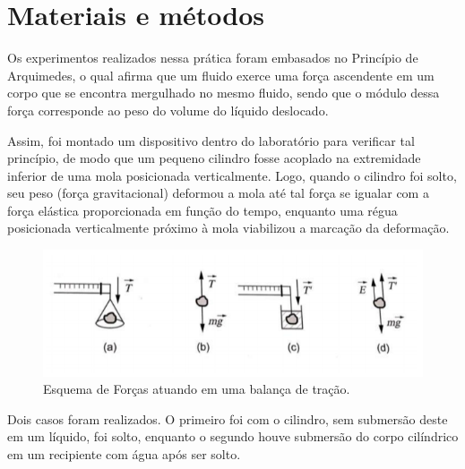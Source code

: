 \newpage
\section{Materiais e métodos}

Os experimentos realizados nessa prática foram embasados no Princípio de Arquimedes, o qual afirma que um fluido exerce uma força ascendente em um corpo que se encontra mergulhado no mesmo fluido, sendo que o módulo dessa força corresponde ao peso do volume do líquido deslocado.

Assim, foi montado um dispositivo dentro do laboratório para verificar tal princípio, de modo que um pequeno cilindro fosse acoplado na extremidade inferior de uma mola posicionada verticalmente. Logo, quando o cilindro foi solto, seu peso (força gravitacional) deformou a mola até tal força se igualar com a força elástica proporcionada em função do tempo, enquanto uma régua posicionada verticalmente próximo à mola viabilizou a marcação da deformação.

\begin{figure}[H]
    \centering
    \includegraphics[scale=0.8]{images/Experimento1.png}
    \caption{Esquema de Forças atuando em uma balança de tração.}
\end{figure}

Dois casos foram realizados. O primeiro foi com o cilindro, sem submersão deste em um líquido, foi solto, enquanto o segundo houve submersão do corpo cilíndrico em um recipiente com água após ser solto.









